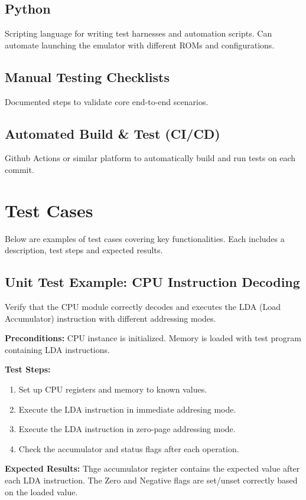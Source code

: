 \documentclass[a4paper, 11pt]{article}
\begin{document}
\subsection{Python}
Scripting language for writing test harnesses and automation scripts. Can automate launching the emulator with different ROMs and configurations.

\subsection{Manual Testing Checklists}
Documented steps to validate core end-to-end scenarios.

\subsection{Automated Build \& Test (CI/CD)}
Github Actions or similar platform to automatically build and run tests on each commit.

\section{Test Cases}
Below are examples of test cases covering key functionalities. Each includes a description, test steps and expected results.

\subsection{Unit Test Example: CPU Instruction Decoding}
Verify that the CPU module correctly decodes and executes the LDA (Load Accumulator) instruction with different addressing modes.

\textbf{Preconditions:} CPU instance is initialized. Memory is loaded with test program containing LDA instructions.

\textbf{Test Steps:} 
\begin{enumerate}
    \item Set up CPU registers and memory to known values.
    \item Execute the LDA instruction in immediate addresing mode.
    \item Execute the LDA instruction in zero-page addressing mode.
    \item Check the accumulator and status flags after each operation.
\end{enumerate}

\textbf{Expected Results:}
Thge accumulator register contains the expected value after each LDA instruction. The Zero and Negative flags are set/unset correctly based on the loaded value.
\end{document}
